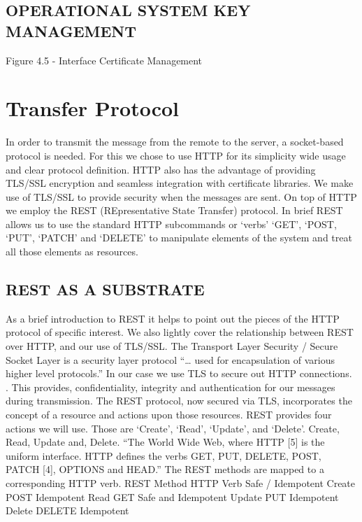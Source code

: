 \subsection{OPERATIONAL SYSTEM KEY MANAGEMENT}
     
     Figure 4.5 - Interface Certificate Management

\section{Transfer Protocol}
     In order to transmit the message from the remote to the server, a socket-based protocol is needed. For this we chose to use HTTP for its simplicity wide usage and clear protocol definition. \cite{Moore:we, Fielding:eSmSU8EF} 
     HTTP also has the advantage of providing TLS/SSL encryption and seamless integration with certificate libraries. We make use of TLS/SSL to provide security when the messages are sent. 
     On top of HTTP we employ the REST (REpresentative State Transfer) protocol. \cite{Fielding:2000dd}  In brief REST allows us to use the standard HTTP subcommands or ‘verbs’ ‘GET’, ‘POST, ‘PUT’, ‘PATCH’ and ‘DELETE’ to manipulate elements of the system and treat all those elements as resources. 
\subsection{REST AS A SUBSTRATE}
     As a brief introduction to REST it helps to point out the pieces of the HTTP protocol of specific interest. We also lightly cover the relationship between REST over HTTP, and our use of TLS/SSL.   
     The Transport Layer Security / Secure Socket Layer is a security layer protocol “… used for encapsulation of various higher level protocols.”\cite{dierks:wd}  In our case  we use TLS to secure out HTTP connections. \cite{Rescorla:2000tv}.  This provides, confidentiality, integrity and authentication for our messages during transmission. 
     The REST protocol, now secured via TLS, incorporates the concept of a resource and actions upon those resources. REST provides four actions we will use.  Those are ‘Create’, ‘Read’, ‘Update’, and ‘Delete’.  
     Create, Read, Update and, Delete.  
     “The World Wide Web, where HTTP [5] is the uniform interface. HTTP defines the verbs GET, PUT, DELETE, POST, PATCH [4], OPTIONS and HEAD.” 
      The REST methods are mapped to a corresponding HTTP verb.  \cite{Fielding:2000dd}
      REST Method HTTP Verb Safe / Idempotent
      Create  POST  Idempotent
      Read  GET Safe and Idempotent
      Update  PUT Idempotent
      Delete  DELETE  Idempotent




